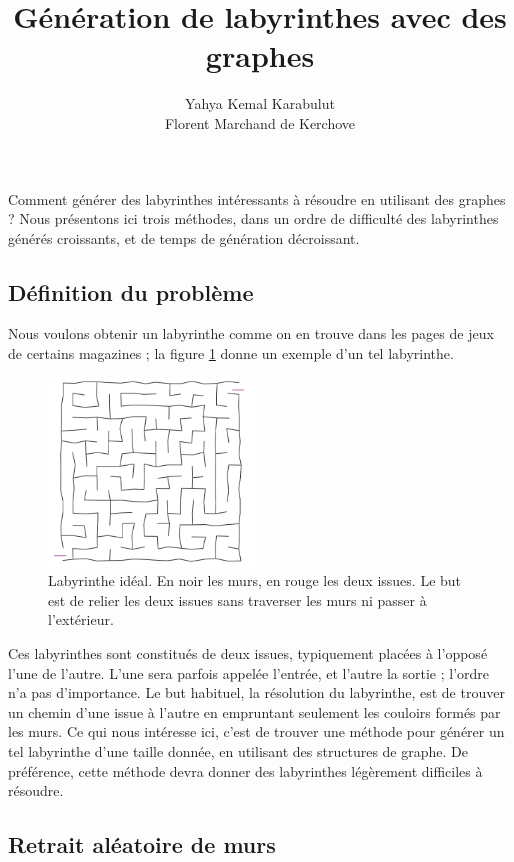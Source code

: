 \documentclass[a4paper, 10pt]{article}
\title{Génération de labyrinthes avec des graphes}
\author{Yahya Kemal Karabulut\\Florent Marchand de Kerchove}
\begin{document}
%
\maketitle
%
%
Comment générer des labyrinthes intéressants à résoudre en utilisant
des graphes ? Nous présentons ici trois méthodes, dans un ordre de
difficulté des labyrinthes générés croissants, et de temps de
génération décroissant.

\subsection*{Définition du problème}

Nous voulons obtenir un labyrinthe comme on en trouve dans les pages
de jeux de certains magazines ; la figure \ref{fig:laby-canon} donne
un exemple d'un tel labyrinthe.

\begin{figure}[hbt]
  \centering
  \includegraphics[height=5cm]{laby-canon.png}
  \caption{Labyrinthe idéal. En noir les murs, en rouge les deux
    issues. Le but est de relier les deux issues sans traverser les
    murs ni passer à l'extérieur.}
  \label{fig:laby-canon}
\end{figure}

Ces labyrinthes sont constitués de deux issues, typiquement placées à
l'opposé l'une de l'autre. L'une sera parfois appelée l'entrée, et
l'autre la sortie ; l'ordre n'a pas d'importance. Le but habituel, la
résolution du labyrinthe, est de trouver un chemin d'une issue à
l'autre en empruntant seulement les couloirs formés par les murs. Ce
qui nous intéresse ici, c'est de trouver une méthode pour générer un
tel labyrinthe d'une taille donnée, en utilisant des structures de
graphe. De préférence, cette méthode devra donner des labyrinthes
légèrement difficiles à résoudre.

\subsection*{Retrait aléatoire de murs}
\end{document}
